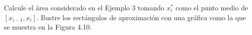 \item Calcule el área considerado en el Ejemplo 3 tomando $x_i^*$ como el punto medio de $[x_{i-1}, x_i]$. Ilustre los rectángulos de aproximación con una gráfica como la que se muestra en la Figura 4.10.
